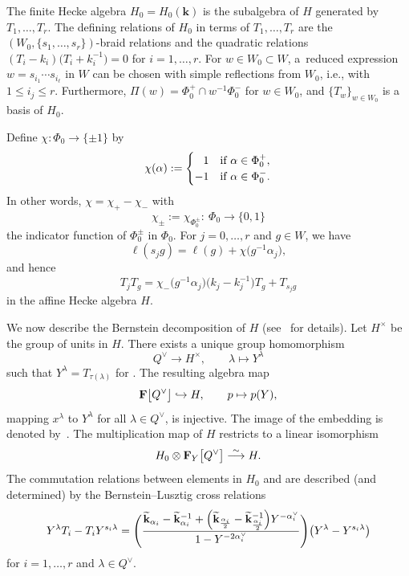 The finite Hecke algebra $H_0=H_0(\mathbf{k})$ is the subalgebra of $H$ generated by $T_1,\dots,T_r$. The defining relations of $H_0$ in terms of $T_1,\dots,T_r$
are the $(W_0,\{s_1,\dots,s_r\})$-braid relations and the quadratic relations $(T_i-k_i)\bigl(T_i+k_i^{-1}\bigr)=0$ for $i=1,\dots,r$.
For $w\in W_0\subset W$, a~reduced expression $w=s_{i_1}\cdots s_{i_\ell}$ in $W$ can be chosen with simple reflections from $W_0$, i.e., with $1\leq i_j\leq r$. Furthermore,
$\Pi(w)=\Phi_0^+\cap w^{-1}\Phi_0^-$ for $w\in W_0$, and $\{T_w\}_{w\in W_0}$ is a basis of $H_0$.

Define $\chi\colon \Phi_0\rightarrow \{\pm 1\}$ by
\begin{equation}\label{chi}
\chi(\alpha):=
\begin{cases}
\hphantom{-}1&\text{if}\ \alpha\in\Phi_0^{+},\\
-1&\text{if}\ \alpha\in\Phi_0^-.
\end{cases}
\end{equation}
In other words, $\chi=\chi_+-\chi_-$ with
\begin{equation*}%
\chi_{\pm}:=\chi_{\Phi_0^{\pm}}\colon\ \Phi_0\rightarrow \{0,1\}
\end{equation*}
the indicator function of $\Phi_0^{\pm}$ in $\Phi_0$.
For $j=0,\dots,r$ and $g\in W$, we have
\begin{equation*}%
\ell(s_jg)=\ell(g)+\chi\bigl(g^{-1}\alpha_j\bigr),
\end{equation*}
and hence
\begin{equation}\label{TjTw}
T_jT_g=\chi_-\bigl(g^{-1}\alpha_j\bigr)\bigl(k_j-k_j^{-1}\bigr)T_g+T_{s_jg}
\end{equation}
in the affine Hecke algebra $H$.

We now describe the Bernstein decomposition of $H$ (see~\cite{Lu} for details).
Let $H^\times$ be the group of units in $H$. There exists a unique group homomorphism
\[
Q^\vee\rightarrow H^\times,\qquad \lambda\mapsto Y^\lambda
\]
such that $Y^\lambda=T_{\tau(\lambda)}$ for .
The resulting algebra map
\begin{equation}\label{injY}
\mathbf{F}\smash{\bigl[Q^\vee\bigr]}\hookrightarrow H,\qquad p\mapsto p(Y),
\end{equation}
mapping $x^\lambda$ to $Y^\lambda$ for all $\lambda\in Q^\vee$, is injective. The image of the embedding is denoted by~.
The multiplication map of $H$ restricts to a linear isomorphism
\[
H_0\otimes\mathbf{F}_Y\smash{\bigl[Q^\vee\bigr]}\overset{\sim}{\longrightarrow} H.
\]
The commutation relations between elements in $H_0$ and  are described (and determined) by the {Bernstein--Lusztig} cross relations
\begin{equation}\label{crossY}
Y^\lambda T_i-T_i Y^{s_i\lambda}=\Biggl(\frac{\widetilde{\mathbf{k}}_{\alpha_i}-\widetilde{\mathbf{k}}_{\alpha_i}^{-1}+
\Bigl(\widetilde{\mathbf{k}}_{\frac{\alpha_i}{2}}-\widetilde{\mathbf{k}}_{\frac{\alpha_i}{2}}^{-1}\Bigr)Y^{-\alpha_i^\vee}}{1-Y^{-2\alpha_i^\vee}}\Biggr)\bigl(Y^\lambda-Y^{s_i\lambda}\bigr)
\end{equation}
for $i=1,\dots,r$ and $\lambda\in Q^\vee$.

